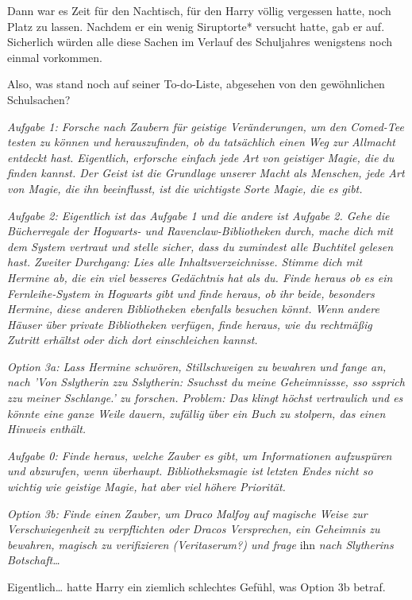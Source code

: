 {Dann war es Zeit für den Nachtisch, für den Harry völlig vergessen hatte, noch Platz zu lassen. Nachdem er ein wenig Siruptorte* versucht hatte, gab er auf. Sicherlich würden alle diese Sachen im Verlauf des Schuljahres wenigstens noch einmal vorkommen.

Also, was stand noch auf seiner To-do-Liste, abgesehen von den gewöhnlichen Schulsachen?

\emph{Aufgabe 1: Forsche nach Zaubern für geistige Veränderungen, um den Comed-Tee testen zu können und herauszufinden, ob du tatsächlich einen Weg zur Allmacht entdeckt hast. Eigentlich, erforsche einfach jede Art von geistiger Magie, die du finden kannst. Der Geist ist die Grundlage unserer Macht als Menschen, jede Art von Magie, die ihn beeinflusst, ist die wichtigste Sorte Magie, die es gibt.}

\emph{Aufgabe 2: Eigentlich ist das Aufgabe 1 und die andere ist Aufgabe 2. Gehe die Bücherregale der Hogwarts- und Ravenclaw-Bibliotheken} \emph{durch, mache dich mit dem System vertraut und stelle sicher, dass du zumindest alle Buchtitel gelesen hast. Zweiter Durchgang: Lies alle Inhaltsverzeichnisse. Stimme dich mit Hermine ab, die ein viel besseres Gedächtnis hat als du. Finde heraus ob es ein Fernleihe-System in} \emph{Hogwarts gibt und finde heraus, ob ihr beide, besonders Hermine, diese anderen Bibliotheken ebenfalls besuchen könnt. Wenn andere Häuser über private Bibliotheken verfügen, finde heraus, wie du rechtmäßig Zutritt erhältst oder dich dort einschleichen kannst.}

\emph{Option 3a: Lass Hermine schwören, Stillschweigen zu bewahren und fange an, nach 'Von Sslytherin zzu Sslytherin: Ssuchsst du meine Geheimnissse, sso ssprich zzu meiner Sschlange.' zu forschen. Problem: Das klingt höchst vertraulich und es könnte eine ganze Weile dauern, zufällig über ein Buch zu stolpern, das einen Hinweis enthält.}

\emph{Aufgabe 0: Finde heraus, welche} \emph{Zauber es gibt, um Informationen aufzuspüren und abzurufen,} \emph{wenn überhaupt. Bibliotheksmagie ist} \emph{letzten Endes} \emph{nicht so wichtig wie geistige Magie, hat aber viel höhere Priorität.}

\emph{Option 3b: Finde einen Zauber, um Draco Malfoy auf magische Weise zur Verschwiegenheit zu verpflichten oder Dracos Versprechen, ein Geheimnis zu bewahren, magisch zu verifizieren (Veritaserum?) und frage} ihn \emph{nach Slytherins Botschaft…}

Eigentlich… hatte Harry ein ziemlich schlechtes Gefühl, was Option 3b betraf.

}
